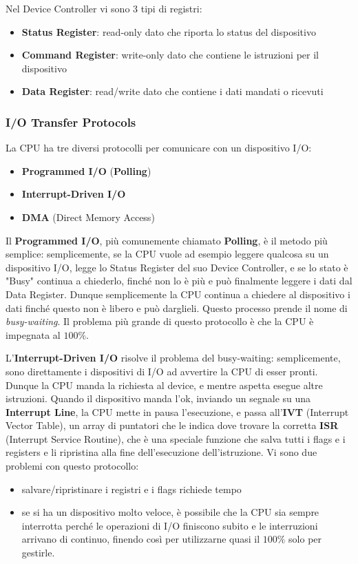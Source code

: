 \documentclass[11pt, a4paper, titlepage, oneside]{scrbook}
\begin{document}
\begin{Proprieta}
\label{prop-registri-device-controller}
Nel Device Controller vi sono 3 tipi di registri:
\begin{itemize}
    \item \textbf{Status Register}: read-only dato che riporta lo status del dispositivo
    \item \textbf{Command Register}: write-only dato che contiene le istruzioni per il dispositivo
    \item \textbf{Data Register}: read/write dato che contiene i dati mandati o ricevuti
\end{itemize}
\end{Proprieta}

\subsubsection*{I/O Transfer Protocols}

La CPU ha tre diversi protocolli per comunicare con un dispositivo I/O:
\begin{itemize}
    \item \textbf{Programmed I/O} (\textbf{Polling})
    \item \textbf{Interrupt-Driven I/O}
    \item \textbf{DMA} (Direct Memory Access)
\end{itemize}

Il \textbf{Programmed I/O}, più comunemente chiamato \textbf{Polling}, è il metodo più semplice: semplicemente, se la CPU vuole ad esempio leggere qualcosa su un dispositivo I/O, legge lo Status Register del suo Device Controller, e se lo stato è "Busy" continua a chiederlo, finché non lo è più e può finalmente leggere i dati dal Data Register. Dunque semplicemente la CPU continua a chiedere al dispositivo i dati finché questo non è libero e può darglieli. Questo processo prende il nome di \textit{busy-waiting}. Il problema più grande di questo protocollo è che la CPU è impegnata al $100\%$.

L'\textbf{Interrupt-Driven I/O} risolve il problema del busy-waiting: semplicemente, sono direttamente i dispositivi di I/O ad avvertire la CPU di esser pronti. Dunque la CPU manda la richiesta al device, e mentre aspetta esegue altre istruzioni. Quando il dispositivo manda l'ok, inviando un segnale su una \textbf{Interrupt Line}, la CPU mette in pausa l'esecuzione, e passa all'\textbf{IVT} (Interrupt Vector Table), un array di puntatori che le indica dove trovare la corretta \textbf{ISR} (Interrupt Service Routine), che è una speciale funzione che salva tutti i flags e i registers e li ripristina alla fine dell'esecuzione dell'istruzione. Vi sono due problemi con questo protocollo: 
\begin{itemize}
    \item salvare/ripristinare i registri e i flags richiede tempo
    \item se si ha un dispositivo molto veloce, è possibile che la CPU sia sempre interrotta perché le operazioni di I/O finiscono subito e le interruzioni arrivano di continuo, finendo così per utilizzarne quasi il $100\%$ solo per gestirle.
\end{itemize}
\end{document}
